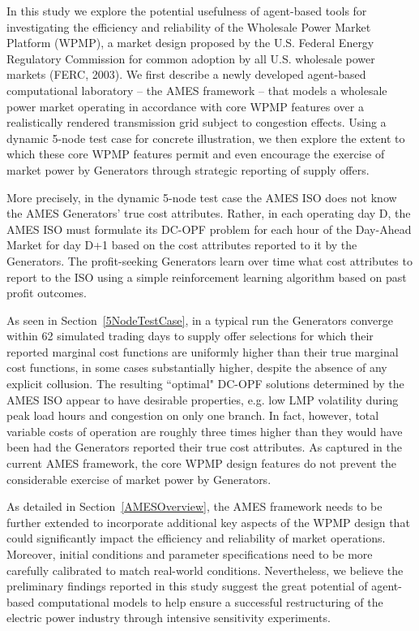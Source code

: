 \documentclass[12pt]{article}
\begin{document}
In this study we explore the potential usefulness of agent-based tools for investigating the efficiency and reliability of the Wholesale Power Market Platform (WPMP), a market design proposed by the U.S. Federal Energy Regulatory Commission for common adoption by all U.S. wholesale power markets (FERC, 2003).  We first describe a newly developed agent-based computational laboratory -- the AMES framework -- that models a wholesale power market operating in accordance with core WPMP features over a realistically rendered transmission grid subject to congestion effects.  Using a dynamic 5-node test case for concrete illustration, we then explore the extent to which these core WPMP features permit and even encourage the exercise of market power by Generators through strategic reporting of supply offers.  

More precisely, in the dynamic 5-node test case the AMES ISO does not know the AMES Generators' true cost attributes.  Rather, in each operating day D, the AMES ISO must formulate its DC-OPF problem for each hour of the Day-Ahead Market for day D+1 based on the cost attributes reported to it by the Generators. The profit-seeking Generators learn over time what cost attributes to report to the ISO using a simple reinforcement learning algorithm based on past profit outcomes. 

As seen in Section~\ref{5NodeTestCase}, in a typical run the Generators converge within 62 simulated trading days to supply offer selections for which their reported marginal cost functions are uniformly higher than their true marginal cost functions, in some cases substantially higher, despite the absence of any explicit collusion.  The resulting ``optimal" DC-OPF solutions determined by the AMES ISO appear to have desirable properties, e.g. low LMP volatility during peak load hours and congestion on only one branch.  In fact, however, total variable costs of operation are roughly three times higher than they would have been had the Generators reported their true cost attributes.  As captured in the current AMES framework, the core WPMP design features do not prevent the considerable exercise of market power by Generators.


As detailed in Section~\ref{AMESOverview}, the AMES framework needs to be further extended to incorporate additional key aspects of the WPMP design that could significantly impact the efficiency and reliability of market operations. Moreover, initial conditions and parameter specifications need to be more carefully calibrated to match real-world conditions.  Nevertheless, we believe the preliminary findings reported in this study suggest the great potential of agent-based computational models to help ensure a successful restructuring of the electric power industry through intensive sensitivity experiments.
\end{document}
